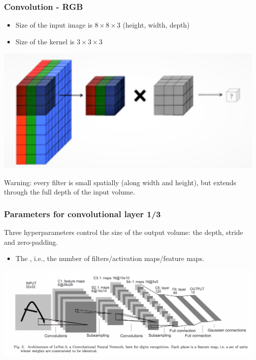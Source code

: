 \begin{frame}
	\frametitle{Convolution - RGB}
	
\begin{itemize}
	\item Size of the input image is $8 \times 8 \times 3$ (height, width, depth)
	\item Size of the kernel is $3 \times 3 \times 3$
\end{itemize}

	\begin{center}
		\includegraphics[scale=0.9]{figs/kernel_volume.png}
	\end{center}

Warning: every filter is small spatially (along width and height), but extends through the full depth of the input volume.


\end{frame}


\begin{frame}
	\frametitle{Parameters for convolutional layer 1/3}
	
	Three hyperparameters control the size of the output volume: the depth, stride and zero-padding.
	
	\begin{itemize}
		\item The , i.e., the number of filters/activation maps/feature maps.
	\end{itemize}
	
	
	

		\begin{center}
			\includegraphics[scale=0.3]{figs/LeNet}
		\end{center}
	
	
\end{frame}


